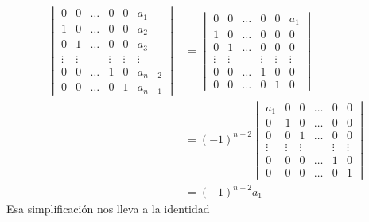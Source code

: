 \documentclass{report}
\theoremstyle{definition}
\theoremstyle{remark}
\begin{document}
  \begin{align}
    \begin{vmatrix}
      0
      &0
      &\dots
      &0
      &0
      &a_1
      \\
      1
      &0
      &\dots
      &0
      &0
      &a_2
      \\
      0
      &1
      &\dots
      &0
      &0
      &a_3
      \\
      \vdots
      &\vdots
      &
      &\vdots
      &\vdots
      &\vdots
      \\
      0
      &0
      &\dots
      &1
      &0
      &a_{n - 2}
      \\
      0
      &0
      &\dots
      &0
      &1
      &a_{n - 1}
    \end{vmatrix}
    &=
    \begin{vmatrix}
      0
      &0
      &\dots
      &0
      &0
      &a_1
      \\
      1
      &0
      &\dots
      &0
      &0
      &0
      \\
      0
      &1
      &\dots
      &0
      &0
      &0
      \\
      \vdots
      &\vdots
      &
      &\vdots
      &\vdots
      &\vdots
      \\
      0
      &0
      &\dots
      &1
      &0
      &0
      \\
      0
      &0
      &\dots
      &0
      &1
      &0
    \end{vmatrix}
    \\
    &=
    (-1)^{n - 2}
    \begin{vmatrix}
      a_1
      &0
      &0
      &\dots
      &0
      &0
      \\
      0
      &1
      &0
      &\dots
      &0
      &0
      \\
      0
      &0
      &1
      &\dots
      &0
      &0
      \\
      \vdots
      &\vdots
      &\vdots
      &
      &\vdots
      &\vdots
      \\
      0
      &0
      &0
      &\dots
      &1
      &0
      \\
      0
      &0
      &0
      &\dots
      &0
      &1
    \end{vmatrix}
    \\
    &=
    (- 1)^{n - 2} a_1
  \end{align}
  Esa simplificación nos lleva a la identidad
\end{document}
